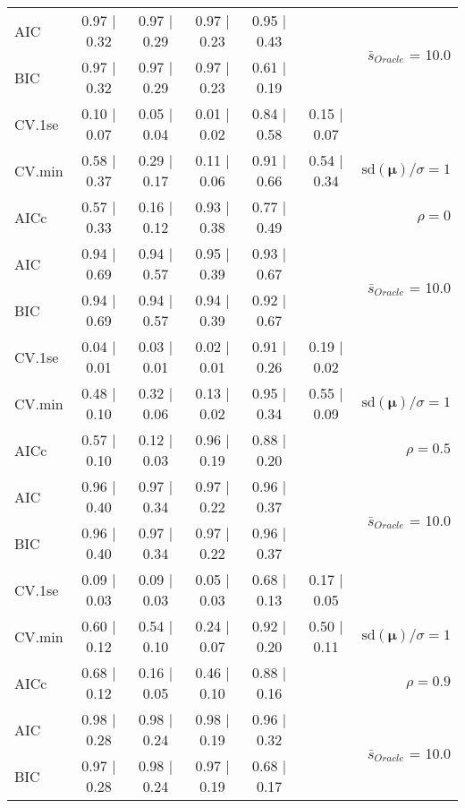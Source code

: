 \begin{table}
\begin{center}
\begin{tabular}{l*{5}{c}|r}
AIC & 0.97 $\mid$ 0.32 & 0.97 $\mid$ 0.29 & 0.97 $\mid$ 0.23 & 0.95 $\mid$ 0.43 & &  \multirow{2}{*}{$\bar{s}_{Oracle}$ = 10.0} \\
BIC & 0.97 $\mid$ 0.32 & 0.97 $\mid$ 0.29 & 0.97 $\mid$ 0.23 & 0.61 $\mid$ 0.19 & &  \\
 \hline 
CV.1se & 0.10 $\mid$ 0.07 & 0.05 $\mid$ 0.04 & 0.01 $\mid$ 0.02 & 0.84 $\mid$ 0.58 & 0.15 $\mid$ 0.07 & \\
CV.min & 0.58 $\mid$ 0.37 & 0.29 $\mid$ 0.17 & 0.11 $\mid$ 0.06 & 0.91 $\mid$ 0.66 & 0.54 $\mid$ 0.34 &  $\mathrm{sd}(\mathbf{\mu})/\sigma=1$ \\
AICc & 0.57 $\mid$ 0.33 & 0.16 $\mid$ 0.12 & 0.93 $\mid$ 0.38 & 0.77 $\mid$ 0.49 & & $\rho=0$ \\
AIC & 0.94 $\mid$ 0.69 & 0.94 $\mid$ 0.57 & 0.95 $\mid$ 0.39 & 0.93 $\mid$ 0.67 & &  \multirow{2}{*}{$\bar{s}_{Oracle}$ = 10.0} \\
BIC & 0.94 $\mid$ 0.69 & 0.94 $\mid$ 0.57 & 0.94 $\mid$ 0.39 & 0.92 $\mid$ 0.67 & &  \\
 \hline 
CV.1se & 0.04 $\mid$ 0.01 & 0.03 $\mid$ 0.01 & 0.02 $\mid$ 0.01 & 0.91 $\mid$ 0.26 & 0.19 $\mid$ 0.02 & \\
CV.min & 0.48 $\mid$ 0.10 & 0.32 $\mid$ 0.06 & 0.13 $\mid$ 0.02 & 0.95 $\mid$ 0.34 & 0.55 $\mid$ 0.09 &  $\mathrm{sd}(\mathbf{\mu})/\sigma=1$ \\
AICc & 0.57 $\mid$ 0.10 & 0.12 $\mid$ 0.03 & 0.96 $\mid$ 0.19 & 0.88 $\mid$ 0.20 & & $\rho=0.5$ \\
AIC & 0.96 $\mid$ 0.40 & 0.97 $\mid$ 0.34 & 0.97 $\mid$ 0.22 & 0.96 $\mid$ 0.37 & &  \multirow{2}{*}{$\bar{s}_{Oracle}$ = 10.0} \\
BIC & 0.96 $\mid$ 0.40 & 0.97 $\mid$ 0.34 & 0.97 $\mid$ 0.22 & 0.96 $\mid$ 0.37 & &  \\
 \hline 
CV.1se & 0.09 $\mid$ 0.03 & 0.09 $\mid$ 0.03 & 0.05 $\mid$ 0.03 & 0.68 $\mid$ 0.13 & 0.17 $\mid$ 0.05 & \\
CV.min & 0.60 $\mid$ 0.12 & 0.54 $\mid$ 0.10 & 0.24 $\mid$ 0.07 & 0.92 $\mid$ 0.20 & 0.50 $\mid$ 0.11 &  $\mathrm{sd}(\mathbf{\mu})/\sigma=1$ \\
AICc & 0.68 $\mid$ 0.12 & 0.16 $\mid$ 0.05 & 0.46 $\mid$ 0.10 & 0.88 $\mid$ 0.16 & & $\rho=0.9$ \\
AIC & 0.98 $\mid$ 0.28 & 0.98 $\mid$ 0.24 & 0.98 $\mid$ 0.19 & 0.96 $\mid$ 0.32 & &  \multirow{2}{*}{$\bar{s}_{Oracle}$ = 10.0} \\
BIC & 0.97 $\mid$ 0.28 & 0.98 $\mid$ 0.24 & 0.97 $\mid$ 0.19 & 0.68 $\mid$ 0.17 & &  \\

\end{tabular}
\end{center}
\end{table}
